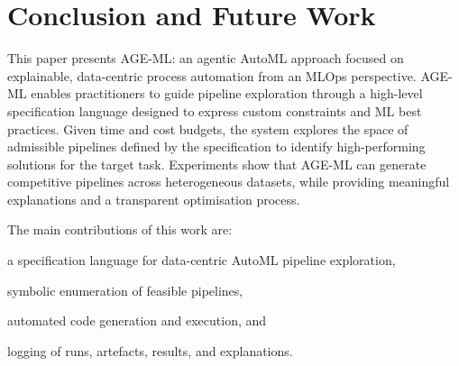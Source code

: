 \documentclass[runningheads]{llncs}
\newenvironment{inlinelist}{\begin{enumerate*}[label=\emph{(\roman*)}]}{\end{enumerate*}}
\newcommand{\ourapproach}[0]{\textsc{AGE-ML}}
\begin{document}





\section{Conclusion and Future Work}
\label{sec:conclusion}

This paper presents \ourapproach{}:
an agentic \ac{AutoML} approach focused on explainable, data-centric process automation from an \ac{MLOps} perspective.
%
\ourapproach{} enables practitioners to guide pipeline exploration through a high-level specification language designed to express custom constraints and \ac{ML} best practices.
%
Given time and cost budgets,
the system explores the space of admissible pipelines defined by the specification to identify high-performing solutions for the target task.
%
Experiments show that \ourapproach{} can generate competitive pipelines across heterogeneous datasets,
while providing meaningful explanations and a transparent optimisation process.

The main contributions of this work are:
%
\begin{inlinelist}
\item a specification language for data-centric \ac{AutoML} pipeline exploration,
\item symbolic enumeration of feasible pipelines,
\item automated code generation and execution,
and
\item logging of runs, artefacts, results, and explanations.
\end{inlinelist}
\end{document}
